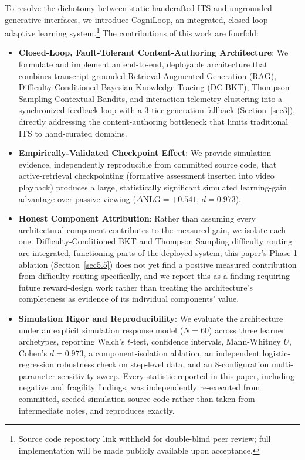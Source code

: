\documentclass[pdflatex,sn-apa]{sn-jnl}
\begin{document}
To resolve the dichotomy between static handcrafted ITS and ungrounded generative interfaces, we introduce CogniLoop, an integrated, closed-loop adaptive learning system.\footnote{Source code repository link withheld for double-blind peer review; full implementation will be made publicly available upon acceptance.} The contributions of this work are fourfold:
\begin{itemize}
\item \textbf{Closed-Loop, Fault-Tolerant Content-Authoring Architecture}: We formulate and implement an end-to-end, deployable architecture that combines transcript-grounded Retrieval-Augmented Generation (RAG), Difficulty-Conditioned Bayesian Knowledge Tracing (DC-BKT), Thompson Sampling Contextual Bandits, and interaction telemetry clustering into a synchronized feedback loop with a 3-tier generation fallback (Section~\ref{sec3}), directly addressing the content-authoring bottleneck that limits traditional ITS to hand-curated domains.
\item \textbf{Empirically-Validated Checkpoint Effect}: We provide simulation evidence, independently reproducible from committed source code, that active-retrieval checkpointing (formative assessment inserted into video playback) produces a large, statistically significant simulated learning-gain advantage over passive viewing ($\Delta\text{NLG}=+0.541$, $d=0.973$).
\item \textbf{Honest Component Attribution}: Rather than assuming every architectural component contributes to the measured gain, we isolate each one. Difficulty-Conditioned BKT and Thompson Sampling difficulty routing are integrated, functioning parts of the deployed system; this paper's Phase 1 ablation (Section~\ref{sec5.5}) does not yet find a positive measured contribution from difficulty routing specifically, and we report this as a finding requiring future reward-design work rather than treating the architecture's completeness as evidence of its individual components' value.
\item \textbf{Simulation Rigor and Reproducibility}: We evaluate the architecture under an explicit simulation response model ($N=60$) across three learner archetypes, reporting Welch's $t$-test, confidence intervals, Mann-Whitney $U$, Cohen's $d=0.973$, a component-isolation ablation, an independent logistic-regression robustness check on step-level data, and an 8-configuration multi-parameter sensitivity sweep. Every statistic reported in this paper, including negative and fragility findings, was independently re-executed from committed, seeded simulation source code rather than taken from intermediate notes, and reproduces exactly.
\end{itemize}
\end{document}
